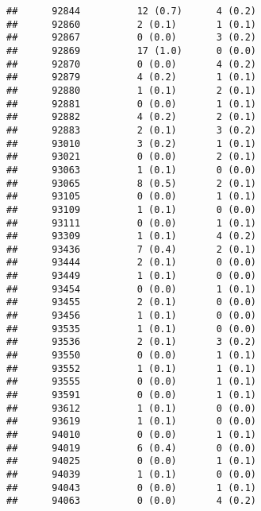 \documentclass[]{article}
\begin{document}
\begin{verbatim}
##      92844          12 (0.7)      4 (0.2)                        
##      92860          2 (0.1)       1 (0.1)                        
##      92867          0 (0.0)       3 (0.2)                        
##      92869          17 (1.0)      0 (0.0)                        
##      92870          0 (0.0)       4 (0.2)                        
##      92879          4 (0.2)       1 (0.1)                        
##      92880          1 (0.1)       2 (0.1)                        
##      92881          0 (0.0)       1 (0.1)                        
##      92882          4 (0.2)       2 (0.1)                        
##      92883          2 (0.1)       3 (0.2)                        
##      93010          3 (0.2)       1 (0.1)                        
##      93021          0 (0.0)       2 (0.1)                        
##      93063          1 (0.1)       0 (0.0)                        
##      93065          8 (0.5)       2 (0.1)                        
##      93105          0 (0.0)       1 (0.1)                        
##      93109          1 (0.1)       0 (0.0)                        
##      93111          0 (0.0)       1 (0.1)                        
##      93309          1 (0.1)       4 (0.2)                        
##      93436          7 (0.4)       2 (0.1)                        
##      93444          2 (0.1)       0 (0.0)                        
##      93449          1 (0.1)       0 (0.0)                        
##      93454          0 (0.0)       1 (0.1)                        
##      93455          2 (0.1)       0 (0.0)                        
##      93456          1 (0.1)       0 (0.0)                        
##      93535          1 (0.1)       0 (0.0)                        
##      93536          2 (0.1)       3 (0.2)                        
##      93550          0 (0.0)       1 (0.1)                        
##      93552          1 (0.1)       1 (0.1)                        
##      93555          0 (0.0)       1 (0.1)                        
##      93591          0 (0.0)       1 (0.1)                        
##      93612          1 (0.1)       0 (0.0)                        
##      93619          1 (0.1)       0 (0.0)                        
##      94010          0 (0.0)       1 (0.1)                        
##      94019          6 (0.4)       0 (0.0)                        
##      94025          0 (0.0)       1 (0.1)                        
##      94039          1 (0.1)       0 (0.0)                        
##      94043          0 (0.0)       1 (0.1)                        
##      94063          0 (0.0)       4 (0.2)                        

\end{verbatim}
\end{document}
